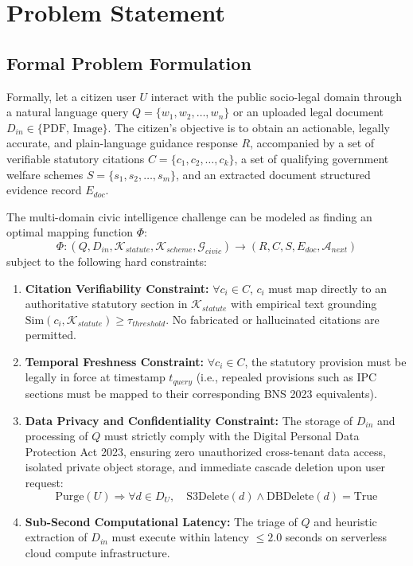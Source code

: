 \chapter{Problem Statement}
\label{ch:problem_statement}

\section{Formal Problem Formulation}
\label{sec:problem_formulation}
Formally, let a citizen user $U$ interact with the public socio-legal domain through a natural language query $Q = \{w_1, w_2, \dots, w_n\}$ or an uploaded legal document $D_{in} \in \{\text{PDF, Image}\}$. The citizen's objective is to obtain an actionable, legally accurate, and plain-language guidance response $R$, accompanied by a set of verifiable statutory citations $C = \{c_1, c_2, \dots, c_k\}$, a set of qualifying government welfare schemes $S = \{s_1, s_2, \dots, s_m\}$, and an extracted document structured evidence record $E_{doc}$.

The multi-domain civic intelligence challenge can be modeled as finding an optimal mapping function $\Phi$:
\begin{equation}
\Phi: (Q, D_{in}, \mathcal{K}_{statute}, \mathcal{K}_{scheme}, \mathcal{G}_{civic}) \longrightarrow (R, C, S, E_{doc}, \mathcal{A}_{next})
\label{eq:mapping_func}
\end{equation}
subject to the following hard constraints:
\begin{enumerate}
    \item \textbf{Citation Verifiability Constraint:} $\forall c_i \in C$, $c_i$ must map directly to an authoritative statutory section in $\mathcal{K}_{statute}$ with empirical text grounding $\text{Sim}(c_i, \mathcal{K}_{statute}) \ge \tau_{threshold}$. No fabricated or hallucinated citations are permitted.
    \item \textbf{Temporal Freshness Constraint:} $\forall c_i \in C$, the statutory provision must be legally in force at timestamp $t_{query}$ (i.e., repealed provisions such as IPC sections must be mapped to their corresponding BNS 2023 equivalents).
    \item \textbf{Data Privacy and Confidentiality Constraint:} The storage of $D_{in}$ and processing of $Q$ must strictly comply with the Digital Personal Data Protection Act 2023, ensuring zero unauthorized cross-tenant data access, isolated private object storage, and immediate cascade deletion upon user request:
    \begin{equation}
    \text{Purge}(U) \Longrightarrow \forall d \in D_U, \quad \text{S3Delete}(d) \land \text{DBDelete}(d) = \text{True}
    \end{equation}
    \item \textbf{Sub-Second Computational Latency:} The triage of $Q$ and heuristic extraction of $D_{in}$ must execute within latency $\le 2.0$ seconds on serverless cloud compute infrastructure.
\end{enumerate}

